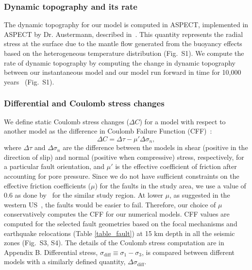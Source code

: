 \documentclass[draft,linenumbers]{agujournal2018}
\begin{document}
\subsubsection{Dynamic topography and its rate}
The dynamic topography for our model is computed in ASPECT, implemented in ASPECT by Dr. Austermann, described in~\citet{austermann2015impact}. This quantity represents the radial stress at the surface due to the mantle flow generated from the buoyancy effects based on the heterogeneous temperature distribution (Fig.~S1). We compute the rate of dynamic topography by computing the change in dynamic topography between our instantaneous model and our model run forward in time for 10,000 years~\citep{becker2015western} (Fig.~S1).   

\subsubsection{Differential and Coulomb stress changes}
We define static Coulomb stress changes ($\Delta C$) for a model with respect to another model as the difference in Coulomb Failure Function (CFF)~\citep{king1994static}:
%
\begin{equation} \label{eq4}
    \Delta C = \Delta \tau - \mu' \Delta \sigma_n,
\end{equation}
%
where $\Delta \tau$ and $\Delta\sigma_n$ are the difference between the models in shear (positive in the direction of slip) and normal (positive when compressive) stress, respectively, for a particular fault orientation, and $\mu'$ is the effective coefficient of friction after accounting for pore pressure. Since we do not have sufficient constraints on the effective friction coefficients ($\mu$) for the faults in the study area, we use a value of 0.6 as done by~\citet{hurd2012intraplate, huang2017stress} for the similar study region. At lower $\mu$, as suggested in the western US~\citep{townend2004regional}, the faults would be easier to fail. Therefore, our choice of $\mu$ conservatively computes the CFF for our numerical models. CFF values are computed for the selected fault geometries based on the focal mechanisms and earthquake relocations (Table \ref{table_fault}) at 15 km depth in all the seismic zones (Fig.~S3, S4). The details of the Coulomb stress computation are in Appendix B. Differential stress, $\sigma_{\text{diff}} \equiv \sigma_{1}-\sigma_{3}$, is compared between different models with a similarly defined quantity, $\Delta \sigma_{\text{diff}}$.
\end{document}
